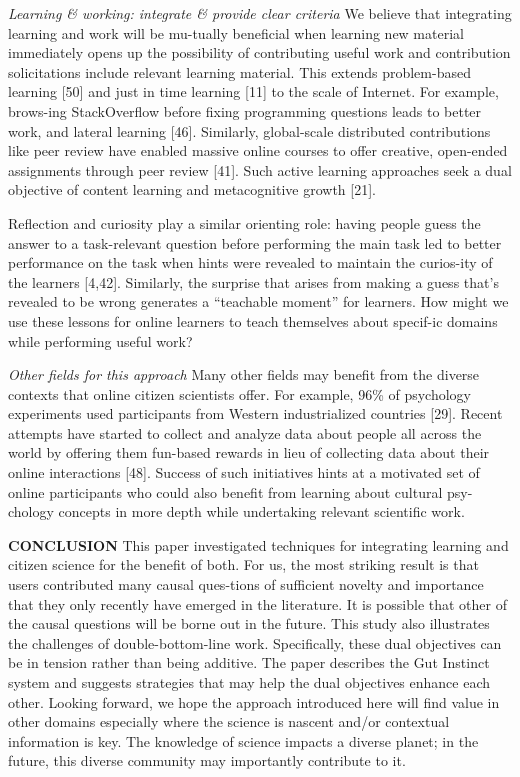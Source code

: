 \textit{Learning \& working: integrate \& provide clear criteria}
We believe that integrating learning and work will be mu-tually beneficial when learning new material immediately opens up the possibility of contributing useful work and contribution solicitations include relevant learning material. This extends problem-based learning [50] and just in time learning [11] to the scale of Internet. For example, brows-ing StackOverflow before fixing programming questions leads to better work, and lateral learning [46]. Similarly, global-scale distributed contributions like peer review have enabled massive online courses to offer creative, open-ended assignments through peer review [41]. Such active learning approaches seek a dual objective of content learning and metacognitive growth [21].
 
Reflection and curiosity play a similar orienting role: having people guess the answer to a task-relevant question before performing the main task led to better performance on the task when hints were revealed to maintain the curios-ity of the learners [4,42]. Similarly, the surprise that arises from making a guess that’s revealed to be wrong generates a “teachable moment” for learners. How might we use these lessons for online learners to teach themselves about specif-ic domains while performing useful work? 

\textit{Other fields for this approach}
Many other fields may benefit from the diverse contexts that online citizen scientists offer. For example, 96\% of psychology experiments used participants from Western industrialized countries [29]. Recent attempts have started to collect and analyze data about people all across the world by offering them fun-based rewards in lieu of collecting data about their online interactions [48]. Success of such initiatives hints at a motivated set of online participants who could also benefit from learning about cultural psy-chology concepts in more depth while undertaking relevant scientific work. 

\textbf{CONCLUSION}
This paper investigated techniques for integrating learning and citizen science for the benefit of both. For us, the most striking result is that users contributed many causal ques-tions of sufficient novelty and importance that they only recently have emerged in the literature. It is possible that other of the causal questions will be borne out in the future. This study also illustrates the challenges of double-bottom-line work. Specifically, these dual objectives can be in tension rather than being additive. The paper describes the Gut Instinct system and suggests strategies that may help the dual objectives enhance each other. Looking forward, we hope the approach introduced here will find value in other domains especially where the science is nascent and/or contextual information is key. The knowledge of science impacts a diverse planet; in the future, this diverse community may importantly contribute to it.


